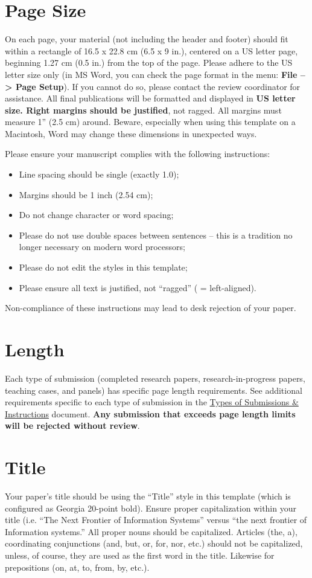 \documentclass{icis}
\begin{document}
\section{Page Size}
On each page, your material (not including the header and footer) should fit within a rectangle of 16.5 x 22.8 cm (6.5 x 9 in.), centered on a US letter page, beginning 1.27 cm (0.5 in.) from the top of the page.  Please adhere to the US letter size only (in MS Word, you can check the page format in the menu: \textbf{File --> Page Setup}). If you cannot do so, please contact the review coordinator for assistance. All final publications will be formatted and displayed in \textbf{US letter size. Right margins should be justified}, not ragged. All margins must measure 1” (2.5 cm) around. Beware, especially when using this template on a Macintosh, Word may change these dimensions in unexpected ways.

Please ensure your manuscript complies with the following instructions:
\begin{itemize}
  \item Line spacing should be single (exactly 1.0);
  \item Margins should be 1 inch (2.54 cm);
  \item Do not change character or word spacing;
  \item Please do not use double spaces between sentences – this is a tradition no longer necessary on modern word processors;
  \item Please do not edit the styles in this template;
  \item Please ensure all text is justified, not “ragged” ( = left-aligned).
\end{itemize}
Non-compliance of these instructions may lead to desk rejection of your paper.

\section{Length}
Each type of submission (completed research papers, research-in-progress papers,
teaching cases, and panels) has specific page length requirements. See
additional requirements specific to each type of submission in the \href{https://icis2022.aisconferences.org/submissions/types-of-submissions/}{Types of Submissions \& Instructions} document. \textbf{Any submission that
  exceeds page length limits will be rejected without review}.

\section{Title}
Your paper’s title should be using the “Title” style in this template (which is configured as Georgia 20-point bold). Ensure proper capitalization within your title (i.e. “The Next Frontier of Information Systems” versus “the next frontier of Information systems.”
All proper nouns should be capitalized. Articles (the, a), coordinating conjunctions (and, but, or, for, nor, etc.) should not be capitalized, unless, of course, they are used as the first word in the title. Likewise for prepositions (on, at, to, from, by, etc.).
\end{document}
